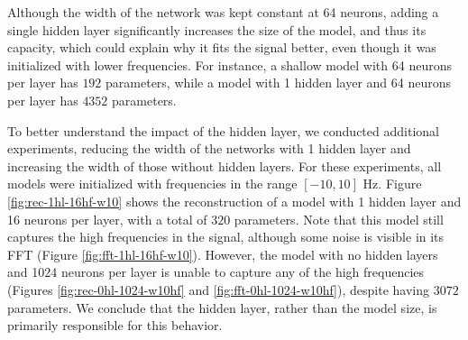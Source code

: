 Although the width of the network was kept constant at 64 neurons, adding a single hidden layer significantly increases the size of the model, and thus its capacity, which could explain why it fits the signal better, even though it was initialized with lower frequencies. For instance, a shallow model with 64 neurons per layer has $192$ parameters, while a model with 1 hidden layer and 64 neurons per layer has $4352$ parameters.

To better understand the impact of the hidden layer, we conducted additional experiments, reducing the width of the networks with 1 hidden layer and increasing the width of those without hidden layers. For these experiments, all models were initialized with frequencies in the range $[-10, 10]$ Hz. Figure \ref{fig:rec-1hl-16hf-w10} shows the reconstruction of a model with 1 hidden layer and 16 neurons per layer, with a total of $320$ parameters. Note that this model still captures the high frequencies in the signal, although some noise is visible in its FFT (Figure \ref{fig:fft-1hl-16hf-w10}). However, the model with no hidden layers and 1024 neurons per layer is unable to capture any of the high frequencies (Figures \ref{fig:rec-0hl-1024-w10hf} and \ref{fig:fft-0hl-1024-w10hf}), despite having $3072$ parameters. We conclude that the hidden layer, rather than the model size, is primarily responsible for this behavior.

